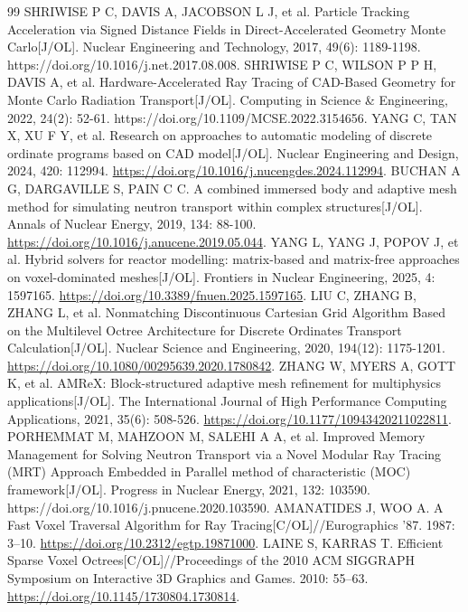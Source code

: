 \documentclass[UTF8, zihao=-4, fontset=none, a4paper]{ctexart}
\begin{document}
\begin{thebibliography}{99}
SHRIWISE P C, DAVIS A, JACOBSON L J, et al. Particle Tracking Acceleration via Signed Distance Fields in Direct-Accelerated Geometry Monte Carlo{[}J/OL{]}. Nuclear Engineering and Technology, 2017, 49(6): 1189-1198. https://doi.org/10.1016/j.net.2017.08.008.
SHRIWISE P C, WILSON P P H, DAVIS A, et al. Hardware-Accelerated Ray Tracing of CAD-Based Geometry for Monte Carlo Radiation Transport{[}J/OL{]}. Computing in Science \& Engineering, 2022, 24(2): 52-61. https://doi.org/10.1109/MCSE.2022.3154656.
YANG C, TAN X, XU F Y, et al. Research on approaches to automatic modeling of discrete ordinate programs based on CAD model{[}J/OL{]}. Nuclear Engineering and Design, 2024, 420: 112994. \url{https://doi.org/10.1016/j.nucengdes.2024.112994}.
BUCHAN A G, DARGAVILLE S, PAIN C C. A combined immersed body and adaptive mesh method for simulating neutron transport within complex structures{[}J/OL{]}. Annals of Nuclear Energy, 2019, 134: 88-100. \url{https://doi.org/10.1016/j.anucene.2019.05.044}.
YANG L, YANG J, POPOV J, et al. Hybrid solvers for reactor modelling: matrix-based and matrix-free approaches on voxel-dominated meshes{[}J/OL{]}. Frontiers in Nuclear Engineering, 2025, 4: 1597165. \url{https://doi.org/10.3389/fnuen.2025.1597165}.
LIU C, ZHANG B, ZHANG L, et al. Nonmatching Discontinuous Cartesian Grid Algorithm Based on the Multilevel Octree Architecture for Discrete Ordinates Transport Calculation{[}J/OL{]}. Nuclear Science and Engineering, 2020, 194(12): 1175-1201. \url{https://doi.org/10.1080/00295639.2020.1780842}.
ZHANG W, MYERS A, GOTT K, et al. AMReX: Block-structured adaptive mesh refinement for multiphysics applications{[}J/OL{]}. The International Journal of High Performance Computing Applications, 2021, 35(6): 508-526. \url{https://doi.org/10.1177/10943420211022811}.
PORHEMMAT M, MAHZOON M, SALEHI A A, et al. Improved Memory Management for Solving Neutron Transport via a Novel Modular Ray Tracing (MRT) Approach Embedded in Parallel method of characteristic (MOC) framework{[}J/OL{]}. Progress in Nuclear Energy, 2021, 132: 103590. https://doi.org/10.1016/j.pnucene.2020.103590.
AMANATIDES J, WOO A. A Fast Voxel Traversal Algorithm for Ray Tracing{[}C/OL{]}//Eurographics '87. 1987: 3--10. \url{https://doi.org/10.2312/egtp.19871000}.
LAINE S, KARRAS T. Efficient Sparse Voxel Octrees{[}C/OL{]}//Proceedings of the 2010 ACM SIGGRAPH Symposium on Interactive 3D Graphics and Games. 2010: 55--63. \url{https://doi.org/10.1145/1730804.1730814}.

\end{thebibliography}
\end{document}
